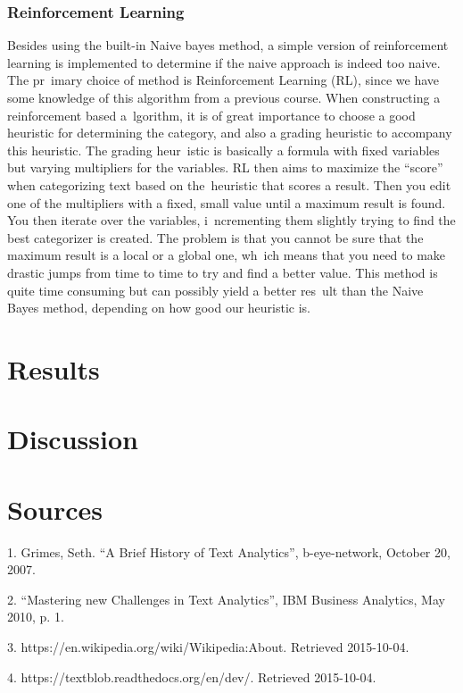 \documentclass[a4paper]{article}
\begin{document}
\subsubsection{Reinforcement Learning}
Besides using the built-in Naive bayes method, a simple version of reinforcement learning is implemented to determine if the naive approach is indeed too naive. The pr\
imary choice of method is Reinforcement Learning (RL), since we have some knowledge of this algorithm from a previous course. When constructing a reinforcement based a\
lgorithm, it is of great importance to choose a good heuristic for determining the category, and also a grading heuristic to accompany this heuristic. The grading heur\
istic is basically a formula with fixed variables but varying multipliers for the variables. RL then aims to maximize the ``score'' when categorizing text based on the\
 heuristic that scores a result. Then you edit one of the multipliers with a fixed, small value until a maximum result is found. You then iterate over the variables, i\
ncrementing them slightly trying to find the best categorizer is created. The problem is that you cannot be sure that the maximum result is a local or a global one, wh\
ich means that you need to make drastic jumps from time to time to try and find a better value. This method is quite time consuming but can possibly yield a better res\
ult than the Naive Bayes method, depending on how good our heuristic is.

\section{Results}

\section{Discussion}


\section{Sources}


1. Grimes, Seth. “A Brief History of Text Analytics”, b-eye-network, October 20, 2007.

2. “Mastering new Challenges in Text Analytics”, IBM Business Analytics, May 2010, p. 1.

3. https://en.wikipedia.org/wiki/Wikipedia:About. Retrieved 2015-10-04.

4. https://textblob.readthedocs.org/en/dev/. Retrieved 2015-10-04.
\end{document}
